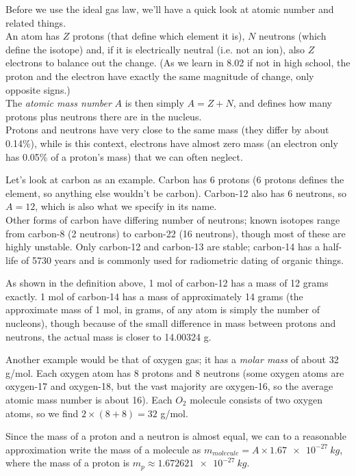 \documentclass[8.01x]{subfiles}
\begin{document}
Before we use the ideal gas law, we'll have a quick look at atomic number and related things.\\
An atom has $Z$ protons (that define which element it is), $N$ neutrons (which define the isotope) and, if it is electrically neutral (i.e. not an ion), also $Z$ electrons to balance out the change. (As we learn in 8.02 if not in high school, the proton and the electron have exactly the same magnitude of change, only opposite signs.)\\
The \emph{atomic mass number} $A$ is then simply $A = Z + N$, and defines how many protons plus neutrons there are in the nucleus.\\
Protons and neutrons have very close to the same mass (they differ by about 0.14\%), while is this context, electrons have almost zero mass (an electron only has 0.05\% of a proton's mass) that we can often neglect.

Let's look at carbon as an example. Carbon has 6 protons (6 protons defines the element, so anything else wouldn't be carbon). Carbon-12 also has 6 neutrons, so $A = 12$, which is also what we specify in its name.\\
Other forms of carbon have differing number of neutrons; known isotopes range from carbon-8 (2 neutrons) to carbon-22 (16 neutrons), though most of these are highly unstable. Only carbon-12 and carbon-13 are stable; carbon-14 has a half-life of 5730 years and is commonly used for radiometric dating of organic things.

As shown in the definition above, 1 mol of carbon-12 has a mass of 12 grams exactly. 1 mol of carbon-14 has a mass of approximately 14 grams (the approximate mass of 1 mol, in grams, of any atom is simply the number of nucleons), though because of the small difference in mass between protons and neutrons, the actual mass is closer to 14.00324 g.

Another example would be that of oxygen gas; it has a \emph{molar mass} of about 32 g/mol. Each oxygen atom has 8 protons and 8 neutrons (some oxygen atoms are oxygen-17 and oxygen-18, but the vast majority are oxygen-16, so the average atomic mass number is about 16). Each $O_2$ molecule consists of two oxygen atoms, so we find $2 \times (8 + 8) = 32$ g/mol.

Since the mass of a proton and a neutron is almost equal, we can to a reasonable approximation write the mass of a molecule as $m_{molecule} = A \times \SI{1.67e-27}{kg}$, where the mass of a proton is $m_p \approx \SI{1.672621e-27}{kg}$.
\end{document}
